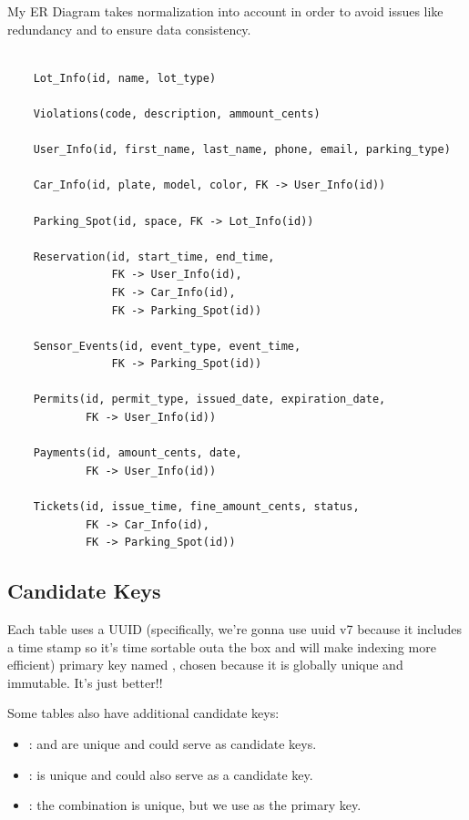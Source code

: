 \documentclass[12pt]{report}
\begin{document}
My ER Diagram takes normalization into account in order to avoid issues like redundancy and to ensure data consistency.

\begin{verbatim}

    Lot_Info(id, name, lot_type)

    Violations(code, description, ammount_cents)

    User_Info(id, first_name, last_name, phone, email, parking_type)

    Car_Info(id, plate, model, color, FK -> User_Info(id))

    Parking_Spot(id, space, FK -> Lot_Info(id))

    Reservation(id, start_time, end_time,
                FK -> User_Info(id),
                FK -> Car_Info(id),
                FK -> Parking_Spot(id))

    Sensor_Events(id, event_type, event_time,
                FK -> Parking_Spot(id))

    Permits(id, permit_type, issued_date, expiration_date,
            FK -> User_Info(id))

    Payments(id, amount_cents, date,
            FK -> User_Info(id))

    Tickets(id, issue_time, fine_amount_cents, status,
            FK -> Car_Info(id),
            FK -> Parking_Spot(id))

\end{verbatim}

\subsection{Candidate Keys}

Each table uses a UUID (specifically, we're gonna use uuid v7 because it includes a time stamp so it's time sortable outa the box and will make indexing more efficient) primary key named , chosen because it is globally unique and immutable.  It's just better!!

Some tables also have additional candidate keys:

\begin{itemize}
    \item {}:  and  are unique and could serve as candidate keys.
    \item {}:  is unique and could also serve as a candidate key.
    \item {}: the combination  is unique, but we use  as the primary key.
\end{itemize}
\end{document}

